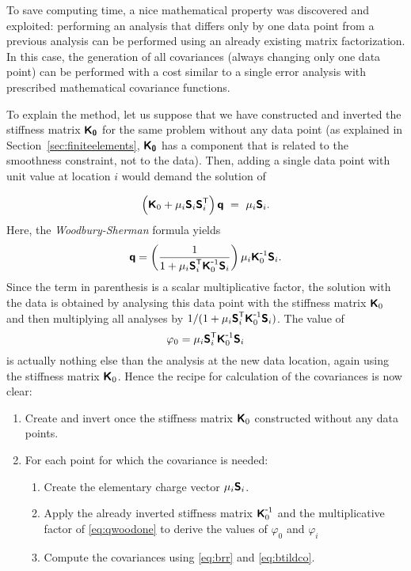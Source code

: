 To save computing time, a nice mathematical property was discovered and exploited: performing an analysis that differs only by one data point from a previous analysis can be performed using an already existing matrix factorization. In this case, the generation of all covariances (always changing only one data point) can be performed with a cost similar to a single error analysis with prescribed mathematical covariance functions.

To explain the method, let us suppose that we have constructed and inverted the stiffness matrix $\mbox{\boldmath $ \protect\mathsf{K_0} $}$ for the same problem without any data point (as explained in Section~\ref{sec:finiteelements}, $\mbox{\boldmath $ \protect\mathsf{K_0} $}$ has a component that is related to the smoothness constraint, not to the data). Then, adding a single data point with unit value at location $i$ would demand the solution of 

\begin{equation}
\left( \mbox{\boldmath $ \protect\mathsf{K} $}_0 + \mu_i \mbox{\boldmath $ \protect\mathsf{S} $}_i {\mbox{\boldmath $ \protect\mathsf{S} $}}^\mathsf{T}_i \right) \mbox{\boldmath $ \protect\mathsf{q} $} ~=~ \mu_i \mbox{\boldmath $ \protect\mathsf{S} $}_i.
\end{equation}
Here, the \textit{Woodbury-Sherman} formula yields
\begin{equation}
\mbox{\boldmath $ \protect\mathsf{q} $}=\left( 1 \over 1 + \mu_i {\mbox{\boldmath $ \protect\mathsf{S} $}}^\mathsf{T}_i {\mbox{\boldmath $ \protect\mathsf{K} $}}^{ \mbox{\small{-}} 1}_0 \mbox{\boldmath $ \protect\mathsf{S} $}_i \right) \mu_i {\mbox{\boldmath $ \protect\mathsf{K} $}}^{ \mbox{\small{-}} 1}_0 \mbox{\boldmath $ \protect\mathsf{S} $}_i.
\label{eq:qwoodone}
\end{equation}
Since the term in parenthesis is a scalar multiplicative factor, the solution with the data is obtained by analysing this data point with the stiffness matrix $\mbox{\boldmath $ \protect\mathsf{K} $}_0$ and then multiplying all analyses by $ 1 /( 1 + \mu_i {\mbox{\boldmath $ \protect\mathsf{S} $}}^\mathsf{T}_i {\mbox{\boldmath $ \protect\mathsf{K} $}}^{ \mbox{\small{-}} 1}_0 \mbox{\boldmath $ \protect\mathsf{S} $}_i)$.
The value of 
\begin{equation} 
\varphi_0 = \mu_i {\mbox{\boldmath $ \protect\mathsf{S} $}}^\mathsf{T}_i {\mbox{\boldmath $ \protect\mathsf{K} $}}^{ \mbox{\small{-}} 1}_0 \mbox{\boldmath $ \protect\mathsf{S} $}_i
\end{equation}
is actually nothing else than the analysis at the new data location, again using the stiffness matrix $\mbox{\boldmath $ \protect\mathsf{K} $}_0$.
Hence the recipe for calculation of the covariances is now clear: 

\begin{enumerate}
\item Create and invert once the stiffness matrix $\mbox{\boldmath $ \protect\mathsf{K} $}_0$ constructed without any data points. 
\item For each point for which the covariance is needed:
\begin{enumerate}
\item Create the elementary charge vector $\mu_i \mbox{\boldmath $ \protect\mathsf{S} $}_i$.
\item Apply the already inverted stiffness matrix ${\mbox{\boldmath $ \protect\mathsf{K} $}}^{ \mbox{\small{-}} 1}_0$  and the multiplicative factor of \eqref{eq:qwoodone} to derive the values of $\varphi_0$ and $\varphi_i$
\item Compute the covariances using \eqref{eq:brr} and \eqref{eq:btildco}.
\end{enumerate}
\end{enumerate}

